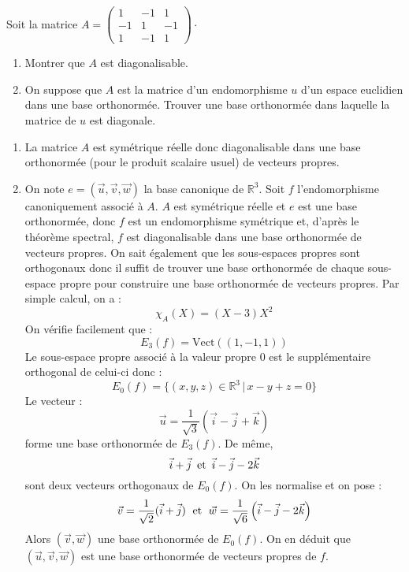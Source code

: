\documentclass[a4paper,10pt]{report}
\begin{document}
\begin{Exa} Soit la matrice $A=\begin{pmatrix}
1 & -1 & 1 \\ 
-1 & 1 & -1 \\ 
1 & -1 & 1
\end{pmatrix} \cdot$
\begin{enumerate}
\item Montrer que $A$ est diagonalisable.
\item On suppose que $A$ est la matrice d'un endomorphisme $u$ d'un espace euclidien dans une base orthonormée. Trouver une base orthonormée dans laquelle la matrice de $u$ est diagonale.
\end{enumerate}
\end{Exa}

\corr 

\begin{enumerate}
\item La matrice $A$ est symétrique réelle donc diagonalisable dans une base orthonormée (pour le produit scalaire usuel) de vecteurs propres.
\item On note $e=\left( \vec{u},\vec{v},\vec{w}\right) $ la base canonique de $\mathbb{R}^3$. Soit $f$ l'endomorphisme canoniquement associé à $A$. $A$ est symétrique réelle et $e$ est une base orthonormée, donc $f$ est un endomorphisme symétrique et, d'après le théorème spectral,  $f$ est diagonalisable dans une base orthonormée de vecteurs propres. On sait également que les sous-espaces propres sont orthogonaux donc il suffit de trouver une base orthonormée de chaque sous-espace propre pour construire une base orthonormée de vecteurs propres. Par simple calcul, on a :
$$ \chi_A(X) = (X-3)X^2$$
On vérifie facilement que :
$$E_3 (f) = \textrm{Vect} ((1, - 1,1))$$
Le sous-espace propre associé à la valeur propre $0$ est le supplémentaire orthogonal de celui-ci donc :
$$E_0 (f) = \lbrace (x,y,z) \in \mathbb{R}^3 \, \vert \, x - y + z = 0\rbrace$$
Le vecteur :
$$\vec{u} = \dfrac{1}{{\sqrt 3 }}(\vec{i} - \vec{j} + \vec{k})$$
forme une base orthonormée de $E_3 (f)$. De même,
$$\vec i+\vec j  \, \hbox{ et } \, \vec i-\vec j-2\vec k$$
 sont deux vecteurs orthogonaux de $E_0(f)$. On les normalise et on pose :
$$\vec{v} = \dfrac{1}{{\sqrt 2 }}(\vec{i} + \vec{j}) \; \hbox{ et } \; \vec{w} = \dfrac{1}{{\sqrt 6 }}\left( {\vec{i} - \vec{j} - 2\vec{k}} \right) $$
Alors $\left( \vec{v} ,\vec{w} \right) $ une base orthonormée de $E_0(f)$. On en déduit que $\left( \vec{u},\vec{v},\vec{w}\right) $ est une base orthonormée de vecteurs propres de $f$.
\end{enumerate}
\end{document}
